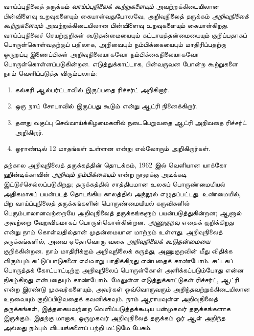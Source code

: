 \documentclass[../../../include/open-logic-section]{subfiles}
\begin{document}


வாய்ப்புநிலைத் தருக்கம் \emph{வாய்ப்புநிலைக் கூற்றுகளையும்} அவற்றுக்கிடையிலான
பின்விளைவு உறவுகளையும் கையாள்வதுபோலவே, அறிவுநிலைத் தருக்கம்
\emph{அறிவுநிலைக் கூற்றுகளையும்} அவற்றுக்கிடையிலான பின்விளைவு உறவுகளையும்
கையாள்கிறது. வாய்ப்புநிலைச் செயற்குறிகள் கூடுதன்மையையும் கட்டாயத்தன்மையையும்
குறிப்பதாகப் பொருள்கொள்வதற்குப் பதிலாக, அறிவையும் நம்பிக்கையையும் மாதிரிப்பதற்கு
ஓருறுப்பு இணைப்பிகள் அறிவுநிலையாகவோ நம்பிக்கைநிலையாகவோ
பொருள்கொள்ளப்படுகின்றன. எடுத்துக்காட்டாக, பின்வருவன போன்ற கூற்றுகளை நாம்
வெளிப்படுத்த விரும்பலாம்:

\begin{enumerate}
\item கல்கரி ஆல்பர்ட்டாவில் இருப்பதை ரிச்சர்ட் அறிகிறார்.
\item ஒரு நாய் சோபாவில் இருப்பது கூடும் என்று ஆட்ரி நினைக்கிறார்.
\item தனது வகுப்பு செவ்வாய்க்கிழமைகளில் நடைபெறுவதை ஆட்ரி அறிவதை ரிச்சர்ட் அறிகிறார்.
\item ஓராண்டில் 12 மாதங்கள் உள்ளன என்று எல்லோரும் அறிகிறார்கள்.
\end{enumerate}
தற்கால அறிவுநிலைத் தருக்கத்தின் தொடக்கம், 1962 இல் வெளியான யாக்கோ
ஹின்டிக்காவின் \emph{அறிவும் நம்பிக்கையும்} என்ற நூலுக்கு அடிக்கடி
இட்டுச்செல்லப்படுகிறது; தருக்கத்தில் சாத்தியமான உலகப் பொருண்மையியல் அதிகமாகப்
பயன்படத் தொடங்கிய காலத்தில் அந்நூல் எழுதப்பட்டது. உண்மையில், பிற வாய்ப்புநிலைத்
தருக்கங்களின் பொருண்மையியல் கருவிகளில் பெரும்பாலானவற்றையே அறிவுநிலைத்
தருக்கங்களும் பயன்படுத்துகின்றன; ஆனால் அவற்றை வேறுவிதமாகப் பொருள்கொள்கின்றன.
\emph{அணுகுறவு} எதைக் குறிக்கிறது என்று நாம் கொள்வதில்தான் முதன்மையான மாற்றம்
உள்ளது. அறிவுநிலைத் தருக்கங்களில், அவை ஏதோவொரு வகை \emph{அறிவுநிலைக்
கூடுதன்மையை} குறிக்கின்றன. நாம் மாதிரிக்கும் அறிவுநிலைக் கருத்து, அணுகுறவின்
மீது விதிக்க விரும்பும் கட்டுப்பாடுகளை எவ்வாறு பாதிக்கிறது என்பதைக் காண்போம்.
சட்டகப் பொருத்தக் கோட்பாட்டிற்கு அறிவுநிலைப் பொருள்கோள் அளிக்கப்படும்போது என்ன
நிகழ்கிறது என்பதையும் காண்போம். மேலுள்ள எடுத்துக்காட்டுகள் ரிச்சர்ட், ஆட்ரி
என்ற இரண்டு முகவர்களையும், அவர்கள் ஒவ்வொருவரும் அறிந்தவற்றுக்கிடையிலான
உறவையும் குறிப்பிடுவதைக் கவனிக்கவும். நாம் ஆராயவுள்ள அறிவுநிலைத் தருக்கங்கள்,
இத்தகையவற்றை வெளிப்படுத்தக்கூடிய பன்முகவர் தருக்கங்களாக இருக்கும். இதற்கு
மாறாக, ஒருமுகவர் அறிவுநிலைத் தருக்கம் ஓர் ஆள் அறிந்த அல்லது நம்பும்
விடயங்களைப் பற்றி மட்டுமே பேசும்.
\end{document}

